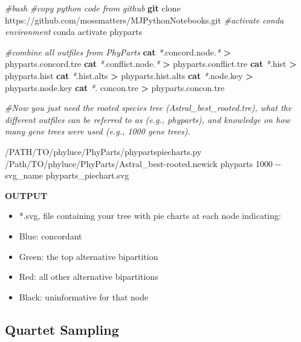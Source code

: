 \documentclass[
  12pt,
]{article}
\newenvironment{Shaded}{\begin{snugshade}}{\end{snugshade}}
\newcommand{\AttributeTok}[1]{\textcolor[rgb]{0.13,0.29,0.53}{#1}}
\newcommand{\CommentTok}[1]{\textcolor[rgb]{0.56,0.35,0.01}{\textit{#1}}}
\newcommand{\ExtensionTok}[1]{#1}
\newcommand{\FunctionTok}[1]{\textcolor[rgb]{0.13,0.29,0.53}{\textbf{#1}}}
\newcommand{\NormalTok}[1]{#1}
\newcommand{\OperatorTok}[1]{\textcolor[rgb]{0.81,0.36,0.00}{\textbf{#1}}}
\newcommand{\PreprocessorTok}[1]{\textcolor[rgb]{0.56,0.35,0.01}{\textit{#1}}}
\providecommand{\tightlist}{%
  \setlength{\itemsep}{0pt}\setlength{\parskip}{0pt}}
\begin{document}
\begin{Shaded}
\begin{Highlighting}[]
\CommentTok{\#bash}
\CommentTok{\#copy python code from github}
\FunctionTok{git}\NormalTok{ clone https://github.com/mossmatters/MJPythonNotebooks.git}
\CommentTok{\#activate conda environment}
\ExtensionTok{conda}\NormalTok{ activate phyparts}

\CommentTok{\#combine all outfiles from PhyParts}
\FunctionTok{cat} \PreprocessorTok{*}\NormalTok{.concord.node.}\PreprocessorTok{*} \OperatorTok{\textgreater{}}\NormalTok{ phyparts.concord.tre}
\FunctionTok{cat} \PreprocessorTok{*}\NormalTok{.conflict.node.}\PreprocessorTok{*} \OperatorTok{\textgreater{}}\NormalTok{ phyparts.conflict.tre}
\FunctionTok{cat} \PreprocessorTok{*}\NormalTok{.hist }\OperatorTok{\textgreater{}}\NormalTok{ phyparts.hist}
\FunctionTok{cat} \PreprocessorTok{*}\NormalTok{.hist.alts }\OperatorTok{\textgreater{}}\NormalTok{ phyparts.hist.alts}
\FunctionTok{cat} \PreprocessorTok{*}\NormalTok{.node.key }\OperatorTok{\textgreater{}}\NormalTok{ phyparts.node.key}
\FunctionTok{cat} \PreprocessorTok{*}\NormalTok{.}
\ExtensionTok{concon.tre} \OperatorTok{\textgreater{}}\NormalTok{ phyparts.concon.tre}

\CommentTok{\#Now you just need the rooted species tree (Astral\_best\_rooted.tre), what the different outfiles can be referred to as (e.g., phyparts), and knowledge on how many gene trees were used (e.g., 1000 gene trees).}

\ExtensionTok{/PATH/TO/phyluce/PhyParts/phypartspiecharts.py}\NormalTok{ /Path/TO/phyluce/PhyParts/Astral\_best{-}rooted.newick phyparts 1000 }\AttributeTok{{-}{-}svg\_name}\NormalTok{ phyparts\_piechart.svg}
\end{Highlighting}
\end{Shaded}

\textbf{OUTPUT}

\begin{itemize}
\tightlist
\item
  *.svg, file containing your tree with pie charts at each node indicating:
\item
  Blue: concordant
\item
  Green: the top alternative bipartition
\item
  Red: all other alternative bipartitions
\item
  Black: uninformative for that node
\end{itemize}

\hypertarget{quartet-sampling}{%
\subsection{Quartet Sampling}\label{quartet-sampling}}
\end{document}
